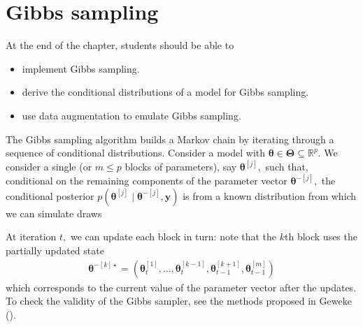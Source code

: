 \documentclass[
  11pt,
  letterpaper,
]{scrbook}
\providecommand{\tightlist}{%
  \setlength{\itemsep}{0pt}\setlength{\parskip}{0pt}}
\theoremstyle{definition}
\theoremstyle{plain}
\theoremstyle{plain}
\theoremstyle{plain}
\theoremstyle{definition}
\theoremstyle{definition}
\theoremstyle{plain}
\theoremstyle{plain}
\theoremstyle{remark}
\begin{document}

\chapter{Gibbs sampling}\label{sec-Gibbs}

\begin{tcolorbox}[enhanced jigsaw, arc=.35mm, bottomrule=.15mm, bottomtitle=1mm, breakable, colback=white, colbacktitle=quarto-callout-important-color!10!white, colframe=quarto-callout-important-color-frame, coltitle=black, left=2mm, leftrule=.75mm, opacityback=0, opacitybacktitle=0.6, rightrule=.15mm, title=\textcolor{quarto-callout-important-color}{\faExclamation}\hspace{0.5em}{\textbf{Learning objectives}:}, titlerule=0mm, toprule=.15mm, toptitle=1mm]

At the end of the chapter, students should be able to

\begin{itemize}
\tightlist
\item
  implement Gibbs sampling.
\item
  derive the conditional distributions of a model for Gibbs sampling.
\item
  use data augmentation to emulate Gibbs sampling.
\end{itemize}

\end{tcolorbox}

The Gibbs sampling algorithm builds a Markov chain by iterating through
a sequence of conditional distributions. Consider a model with
\(\boldsymbol{\theta} \in \boldsymbol{\Theta} \subseteq \mathbb{R}^p.\)
We consider a single (or \(m \leq p\) blocks of parameters), say
\(\boldsymbol{\theta}^{[j]},\) such that, conditional on the remaining
components of the parameter vector \(\boldsymbol{\theta}^{-[j]},\) the
conditional posterior
\(p(\boldsymbol{\theta}^{[j]} \mid \boldsymbol{\theta}^{-[j]}, \boldsymbol{y})\)
is from a known distribution from which we can simulate draws

At iteration \(t,\) we can update each block in turn: note that the
\(k\)th block uses the partially updated state \begin{align*}
\boldsymbol{\theta}^{-[k]\star} = (\boldsymbol{\theta}_{t}^{[1]}, \ldots, \boldsymbol{\theta}_{t}^{[k-1]},\boldsymbol{\theta}_{t-1}^{[k+1]}, \boldsymbol{\theta}_{t-1}^{[m]})
\end{align*} which corresponds to the current value of the parameter
vector after the updates. To check the validity of the Gibbs sampler,
see the methods proposed in Geweke ().
\end{document}
